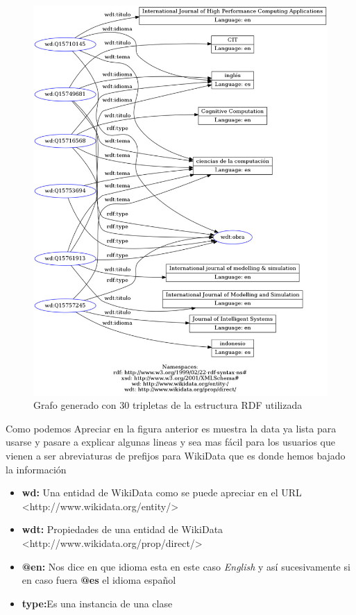 \documentclass[conference]{IEEEtran}
\begin{document}
\begin{figure}[h]
\includegraphics[scale=0.25]{imagenes/grafo_rdf_30.jpeg} 
\caption{Grafo generado con 30 tripletas de la estructura RDF utilizada \cite{b2}}
\end{figure} 

\vspace{0.2cm}

Como podemos Apreciar en la figura anterior es muestra la data ya lista para usarse y pasare a explicar algunas lineas y sea mas fácil para los usuarios que vienen a ser abreviaturas de prefijos para WikiData que es donde hemos bajado la información
\begin{itemize}
	\item \textbf{wd: } Una entidad de WikiData como se puede apreciar en el URL  <http://www.wikidata.org/entity/>
	\item \textbf{wdt: } Propiedades de una entidad de WikiData  <http://www.wikidata.org/prop/direct/>
	\item \textbf{@en:} Nos dice en que idioma esta  en este caso \textit{English} y así sucesivamente si en caso fuera \textbf{@es} el idioma español
	\item\textbf{type:}Es una instancia de una clase
\end{itemize}
\end{document}
